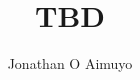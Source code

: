 \documentclass{sig-alternate-per}
\begin{document}
    \title{TBD}


    \author{
        \alignauthor
        Jonathan O Aimuyo\\
        \\
    }

    \newcommand{\ata}{\emph{All-to-All}}

    \maketitle
    

    

    

    

    

    
    
\end{document}
